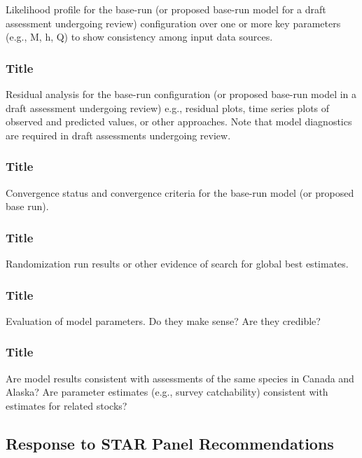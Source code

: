 \documentclass[12pt,]{article}
\begin{document}
Likelihood profile for the base-run (or proposed base-run model for a
draft assessment undergoing review) configuration over one or more key
parameters (e.g., M, h, Q) to show consistency among input data sources.

\subsubsection{Title}\label{title-18}

Residual analysis for the base-run configuration (or proposed base-run
model in a draft assessment undergoing review) e.g., residual plots,
time series plots of observed and predicted values, or other approaches.
Note that model diagnostics are required in draft assessments undergoing
review.

\subsubsection{Title}\label{title-19}

Convergence status and convergence criteria for the base-run model (or
proposed base run).

\subsubsection{Title}\label{title-20}

Randomization run results or other evidence of search for global best
estimates.

\subsubsection{Title}\label{title-21}

Evaluation of model parameters. Do they make sense? Are they credible?

\subsubsection{Title}\label{title-22}

Are model results consistent with assessments of the same species in
Canada and Alaska? Are parameter estimates (e.g., survey catchability)
consistent with estimates for related stocks?

\subsection{Response to STAR Panel
Recommendations}\label{response-to-star-panel-recommendations}
\end{document}
